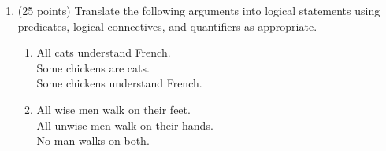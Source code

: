 \documentclass[letterpaper,12pt]{article}
\theoremstyle{plain}
\theoremstyle{definition}
\theoremstyle{remark}
\providecommand{\land}{\ensuremath{\wedge}}
\providecommand{\lor}{\ensuremath{\vee}}
\begin{document}
\begin{enumerate}
\item (25 points)
  Translate the following arguments into logical statements using predicates, logical connectives, and quantifiers as appropriate.
  

  \begin{enumerate}
  \item
    All cats understand French.\\
    Some chickens are cats.\\
    Some chickens understand French.

  \item
    All wise men walk on their feet.\\
    All unwise men walk on their hands.\\
    No man walks on both.

    
  \end{enumerate}

\end{enumerate}
\end{document}
